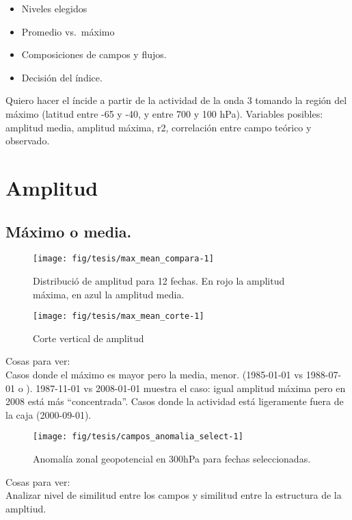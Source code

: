 \documentclass[spanish,a4paper]{book}
\providecommand{\tightlist}{%
  \setlength{\itemsep}{0pt}\setlength{\parskip}{0pt}}
\begin{document}
\begin{itemize}
\tightlist
\item
  Niveles elegidos
\item
  Promedio vs.~máximo
\item
  Composiciones de campos y flujos.
\item
  Decisión del índice.
\end{itemize}

Quiero hacer el íncide a partir de la actividad de la onda 3 tomando la
región del máximo (latitud entre -65 y -40, y entre 700 y 100 hPa).
Variables posibles: amplitud media, amplitud máxima, r2, correlación
entre campo teórico y observado.

\section{Amplitud}\label{amplitud}

\subsection{Máximo o media.}\label{maximo-o-media.}

\begin{figure*}
\texttt{[image: fig/tesis/max\_mean\_compara-1]} \caption{Distribució de amplitud para 12 fechas. En rojo la amplitud máxima, en azul la amplitud media.}\label{fig:max_mean_compara}
\end{figure*}

\begin{figure*}
\texttt{[image: fig/tesis/max\_mean\_corte-1]} \caption{Corte vertical de amplitud}\label{fig:max_mean_corte}
\end{figure*}

Cosas para ver:\\
Casos donde el máximo es mayor pero la media, menor. (1985-01-01 vs
1988-07-01 o ). 1987-11-01 vs 2008-01-01 muestra el caso: igual amplitud
máxima pero en 2008 está más ``concentrada''. Casos donde la actividad
está ligeramente fuera de la caja (2000-09-01).

\begin{figure*}
\texttt{[image: fig/tesis/campos\_anomalia\_select-1]} \caption{Anomalía zonal geopotencial en 300hPa para fechas seleccionadas.}\label{fig:campos_anomalia_select}
\end{figure*}

Cosas para ver:\\
Analizar nivel de similitud entre los campos y similitud entre la
estructura de la ampltiud.
\end{document}
